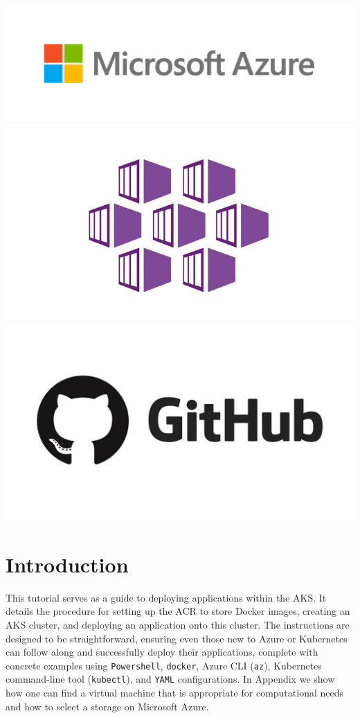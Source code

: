 \documentclass{article}
\begin{document}
\includegraphics[scale=.15]{figures/azure-logo.png}
\includegraphics[scale=.15]{figures/aks-logo.jpg}
\includegraphics[scale=.07]{figures/github-logo.jpg}

\newpage
\tableofcontents

\section*{Introduction}

This tutorial serves as a guide to deploying applications within the AKS. It details the procedure for setting up the ACR to store Docker images, creating an AKS cluster, and deploying an application onto this cluster. The instructions are designed to be straightforward, ensuring even those new to Azure or Kubernetes can follow along and successfully deploy their applications, complete with concrete examples using \texttt{Powershell}, \texttt{docker}, Azure CLI (\texttt{az}), Kubernetes command-line tool (\texttt{kubectl}), and \texttt{YAML} configurations. In Appendix we show how one can find a virtual machine that is appropriate for computational needs and how to select a storage on Microsoft Azure.
\end{document}
